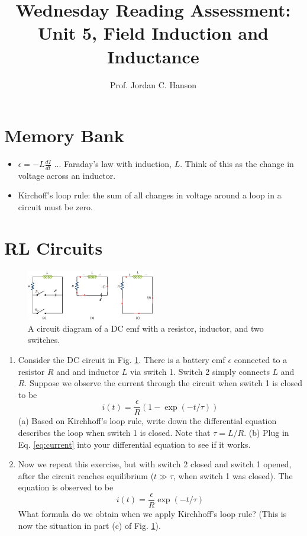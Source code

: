 \documentclass{article}
\begin{document}
\title{Wednesday Reading Assessment: Unit 5, Field Induction and Inductance}
\author{Prof. Jordan C. Hanson}

\maketitle

\section{Memory Bank}

\begin{itemize}
\item $\epsilon = -L \frac{dI}{dt}$ ... Faraday's law with induction, $L$.  Think of this as the change in voltage across an inductor.
\item Kirchoff's loop rule: the sum of all changes in voltage around a loop in a circuit must be zero.
\end{itemize}

\section{RL Circuits}

\begin{figure}
\centering
\includegraphics[width=0.5\textwidth]{rl.jpeg}
\caption{\label{fig:rl} A circuit diagram of a DC emf with a resistor, inductor, and two switches.}
\end{figure}

\begin{enumerate}
\item Consider the DC circuit in Fig. \ref{fig:rl}.  There is a battery emf $\epsilon$ connected to a resistor $R$ and and inductor $L$ via switch 1.  Switch 2 simply connects $L$ and $R$.  Suppose we observe the current through the circuit when switch 1 is closed to be
\begin{equation}
i(t) = \frac{\epsilon}{R}\left(1 - \exp(-t/\tau) \right) \label{eq:current}
\end{equation}
(a) Based on Kirchhoff's loop rule, write down the differential equation describes the loop when switch 1 is closed.  Note that $\tau = L/R$.  (b) Plug in Eq. \ref{eq:current} into your differential equation to see if it works. \\ \vspace{3cm}
\item Now we repeat this exercise, but with switch 2 closed and switch 1 opened, after the circuit reaches equilibrium ($t \gg \tau$, when switch 1 was closed).  The equation is observed to be
\begin{equation}
i(t) = \frac{\epsilon}{R}\exp(-t/\tau)
\end{equation}
What formula do we obtain when we apply Kirchhoff's loop rule?  (This is now the situation in part (c) of Fig. \ref{fig:rl}).
\end{enumerate}
\end{document}
